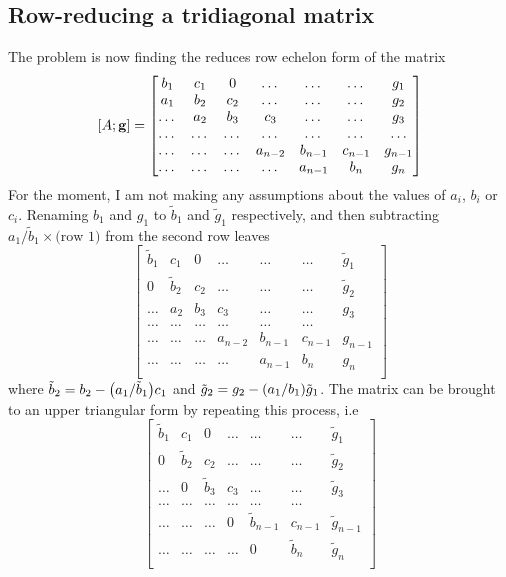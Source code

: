 \documentclass[a4paper,english]{article}
\renewcommand\vec{\mathbf}
\let\originalleft\left
\let\originalright\right
\renewcommand{\left}{\mathopen{}\mathclose\bgroup\originalleft}
\renewcommand{\right}{\aftergroup\egroup\originalright}
\begin{document}
\subsection{Row-reducing a tridiagonal matrix}
The problem is now finding the reduces row echelon form of the matrix
\begin{equation}
  \left[A;\vec{g}\right] =
  \begin{bmatrix}
    b_1& c_1 & 0 &\dots   & \dots &\dots & g_1\\
    a_1 & b_2 & c_2 &\dots &\dots &\dots & g_2\\
    \dots & a_2 & b_3 & c_3 & \dots & \dots & g_3\\
    \dots & \dots   & \dots &\dots &\dots & \dots & \dots\\
    \dots & \dots & \dots &a_{n-2} &b_{n-1}& c_{n-1} & g_{n-1}\\
    \dots & \dots & \dots & \dots &a_{n-1} & b_n & g_n\\
  \end{bmatrix}
\end{equation}
For the moment, I am not making any assumptions about the values of $a_i$, $b_i$ or $c_i$. Renaming $b_1$ and $g_1$ to $\tilde{b}_1$ and $\tilde{g}_1$ respectively, and then subtracting $a_1/\tilde{b}_1\times \text{(row 1)}$ from the second row leaves
\begin{equation}
  \begin{bmatrix}
    \tilde{b}_1& c_1 & 0 &\dots   & \dots &\dots & \tilde{g}_1\\
    0 & \tilde{b}_2 & c_2 &\dots &\dots &\dots & \tilde{g}_2\\
    \dots & a_2 & b_3 & c_3 & \dots & \dots & g_3\\
    \dots & \dots   & \dots &\dots &\dots & \dots \\
    \dots & \dots & \dots &a_{n-2} &b_{n-1}& c_{n-1} & g_{n-1}\\
    \dots & \dots & \dots & \dots &a_{n-1} & b_n & g_n\\
  \end{bmatrix}
\end{equation}
where $\tilde{b}_2 = b_2 - \left(a_1/\tilde{b}_1\right)c_1$ and $\tilde{g}_2 = g_2-\left(a_1/b_1\right)\tilde{g}_1$. The matrix can be brought to an upper triangular form by repeating this process, i.e
\begin{equation}
  \begin{bmatrix}
    \tilde{b}_1& c_1 & 0 &\dots   & \dots &\dots & \tilde{g}_1\\
    0 & \tilde{b}_2 & c_2 &\dots &\dots &\dots & \tilde{g}_2\\
    \dots & 0 & \tilde{b}_3 & c_3 & \dots & \dots & \tilde{g}_3\\
    \dots & \dots   & \dots &\dots &\dots & \dots \\
    \dots & \dots & \dots & 0 &\tilde{b}_{n-1}& c_{n-1} & \tilde{g}_{n-1}\\
    \dots & \dots & \dots & \dots & 0 & \tilde{b}_n & \tilde{g}_n\\
  \end{bmatrix}
\end{equation}
\end{document}

